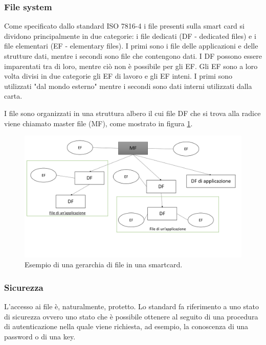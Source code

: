 \subsubsection{File system}
Come specificato dallo standard ISO 7816-4 i file presenti sulla smart card si dividono principalmente in due categorie: i file dedicati (DF - dedicated files) e i file elementari (EF - elementary files). I primi sono i file delle applicazioni e delle strutture dati, mentre i secondi sono file che contengono dati. I DF possono essere imparentati tra di loro, mentre ciò non è possibile per gli EF. Gli EF sono a loro volta divisi in due categorie gli EF di lavoro e gli EF inteni. I primi sono utilizzati "dal mondo esterno" mentre i secondi sono dati interni utilizzati dalla carta.

I file sono organizzati in una struttura albero il cui file DF che si trova alla radice viene chiamato master file (MF), come mostrato in figura \ref{fig:file_system}.

\begin{figure}[h!]
  \centering
  \includegraphics[width=400pt]{pictures/gerarchia_file.png}
  \caption{Esempio di una gerarchia di file in una smartcard.}
  \label{fig:file_system}
\end{figure}

\subsubsection{Sicurezza}
L'accesso ai file è, naturalmente, protetto. Lo standard fa riferimento a uno stato di sicurezza ovvero uno stato che è possibile ottenere al seguito di una procedura di autenticazione nella quale viene richiesta, ad esempio, la conoscenza di una password o di una key.

